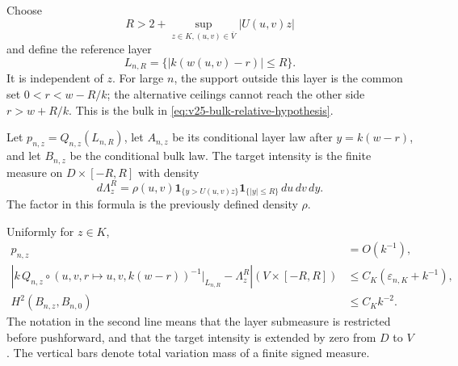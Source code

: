 Choose
\[
 R>2+\sup_{z\in K,(u,v)\in\overline V}|U(u,v)z|
\]
and define the reference layer
\begin{equation}\label{eq:v24-reference-layer}
                 L_{n,R}=\{|k(w(u,v)-r)|\le R\}.
\end{equation}
It is independent of \(z\).  For large \(n\), the support outside this
layer is the common set \(0<r<w-R/k\); the alternative ceilings cannot
reach the other side \(r>w+R/k\).  This is the bulk in
\eqref{eq:v25-bulk-relative-hypothesis}.

Let \(p_{n,z}=Q_{n,z}(L_{n,R})\), let \(A_{n,z}\) be its conditional
layer law after \(y=k(w-r)\), and let \(B_{n,z}\) be the conditional bulk
law.  The target intensity is the finite measure on
\(D\times[-R,R]\) with density
\begin{equation}\label{eq:v24-Lambda-R}
 d\Lambda_z^R=\rho(u,v)
  \mathbf1_{\{y>U(u,v)z\}}\mathbf1_{\{|y|\le R\}}\,du\,dv\,dy.
\end{equation}
The factor in this formula is the previously defined density \(\rho\).

\begin{lemma}
\label{lem:v24-layer-bulk-bounds}
Uniformly for \(z\in K\),
\begin{align}
 p_{n,z}&=O(k^{-1}),\label{eq:v24-layer-p}\\
 \left|k\,Q_{n,z}\circ(u,v,r\mapsto u,v,k(w-r))^{-1}
                    \big|_{L_{n,R}}-\Lambda_z^R\right|(V\times[-R,R])
 &\le C_K(\varepsilon_{n,K}+k^{-1}),\label{eq:v24-layer-measure}\\
 H^2(B_{n,z},B_{n,0})&\le C_Kk^{-2}.\label{eq:v24-bulk-H}
\end{align}
The notation in the second line means that the layer submeasure is
restricted before pushforward, and that the target intensity is extended
by zero from \(D\) to \(V\).  The vertical bars denote total variation
mass of a finite signed measure.
\end{lemma}

